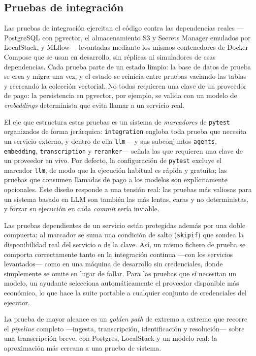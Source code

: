 \subsection{Pruebas de integración}

Las pruebas de integración ejercitan el código contra las dependencias reales —PostgreSQL con
pgvector, el almacenamiento S3 y Secrets Manager emulados por LocalStack, y MLflow— levantadas
mediante los mismos contenedores de Docker Compose que se usan en desarrollo, sin réplicas ni
simuladores de esas dependencias. Cada prueba parte de un estado limpio: la base de datos de prueba se crea y
migra una vez, y el estado se reinicia entre pruebas vaciando las tablas y recreando la colección
vectorial. No todas requieren una clave de un proveedor de pago: la persistencia en pgvector, por
ejemplo, se valida con un modelo de \textit{embeddings} determinista que evita llamar a un servicio
real.

El eje que estructura estas pruebas es un sistema de \textit{marcadores} de \texttt{pytest}
organizados de forma jerárquica: \texttt{integration} engloba toda prueba que necesita un servicio
externo, y dentro de ella \texttt{llm} —y sus subconjuntos \texttt{agents}, \texttt{embedding},
\texttt{transcription} y \texttt{reranker}— señala las que requieren una clave de un proveedor en
vivo. Por defecto, la configuración de \texttt{pytest} excluye el marcador \texttt{llm}, de modo que
la ejecución habitual es rápida y gratuita; las pruebas que consumen llamadas de pago a los modelos
son explícitamente opcionales. Este diseño responde a una tensión real: las pruebas más valiosas
para un sistema basado en \ac{LLM} son también las más lentas, caras y no deterministas, y forzar su
ejecución en cada \textit{commit} sería inviable.

Las pruebas dependientes de un servicio están protegidas además por una doble compuerta: al
marcador se suma una condición de salto (\texttt{skipif}) que sondea la disponibilidad real del
servicio o de la clave. Así, un mismo fichero de prueba se comporta correctamente tanto en la
integración continua —con los servicios levantados— como en una máquina de desarrollo sin
credenciales, donde simplemente se omite en lugar de fallar. Para las pruebas que sí necesitan un
modelo, un ayudante selecciona automáticamente el proveedor disponible más económico, lo que hace
la suite portable a cualquier conjunto de credenciales del ejecutor.

La prueba de mayor alcance es un \textit{golden path} de extremo a extremo que recorre el
\textit{pipeline} completo —ingesta, transcripción, identificación y resolución— sobre una
transcripción breve, con Postgres, LocalStack y un modelo real: la aproximación más cercana a una
prueba de sistema.

